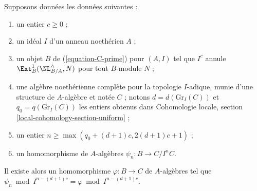 \begin{lemma}
\label{lemma-get-morphism-general-better}
Supposons données les données suivantes :
\begin{enumerate}
\item un entier $c \geq 0$ ;
\item un idéal $I$ d'un anneau noethérien $A$ ;
\item un objet $B$ de (\ref{equation-C-prime}) pour $(A, I)$ tel que $I^c$
annule $\Ext^1_B(\NL_{B/A}^\wedge, N)$ pour tout $B$-module $N$ ;
\item une algèbre noethérienne complète pour la topologie $I$-adique, munie
d'une structure de $A$-algèbre et notée $C$ ; notons
$d = d(\text{Gr}_I(C))$ et
$q_0 = q(\text{Gr}_I(C))$ les entiers obtenus dans Cohomologie locale,
section \ref{local-cohomology-section-uniform} ;
\item un entier $n \geq \max(q_0 + (d + 1)c, 2(d + 1)c + 1)$ ;
\item un homomorphisme de $A$-algèbres $\psi_n : B \to C/I^nC$.
\end{enumerate}
Il existe alors un homomorphisme $\varphi : B \to C$ de $A$-algèbres tel que
$\psi_n \bmod I^{n - (d + 1)c} = \varphi \bmod I^{n - (d + 1)c}$.
\end{lemma}

